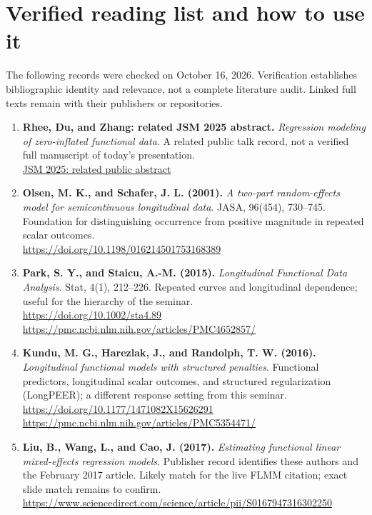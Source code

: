 \documentclass[11pt]{article}
\begin{document}
\section{Verified reading list and how to use it}
The following records were checked on October 16, 2026. Verification establishes bibliographic identity and relevance, not a complete literature audit. Linked full texts remain with their publishers or repositories.
\begin{enumerate}[label=\textbf{\arabic*.},leftmargin=*]
\item \textbf{Rhee, Du, and Zhang: related JSM 2025 abstract.} \emph{Regression modeling of zero-inflated functional data}. A related public talk record, not a verified full manuscript of today's presentation.\\\href{https://ww2.amstat.org/meetings/jsm/2025/onlineprogram/abstract.cfm?sid=2865&tid=3469}{JSM 2025: related public abstract}
\item \textbf{Olsen, M. K., and Schafer, J. L. (2001).} \emph{A two-part random-effects model for semicontinuous longitudinal data}. JASA, 96(454), 730--745. Foundation for distinguishing occurrence from positive magnitude in repeated scalar outcomes.\\\url{https://doi.org/10.1198/016214501753168389}
\item \textbf{Park, S. Y., and Staicu, A.-M. (2015).} \emph{Longitudinal Functional Data Analysis}. Stat, 4(1), 212--226. Repeated curves and longitudinal dependence; useful for the hierarchy of the seminar.\\\url{https://doi.org/10.1002/sta4.89}\\\url{https://pmc.ncbi.nlm.nih.gov/articles/PMC4652857/}
\item \textbf{Kundu, M. G., Harezlak, J., and Randolph, T. W. (2016).} \emph{Longitudinal functional models with structured penalties}. Functional predictors, longitudinal scalar outcomes, and structured regularization (LongPEER); a different response setting from this seminar.\\\url{https://doi.org/10.1177/1471082X15626291}\\\url{https://pmc.ncbi.nlm.nih.gov/articles/PMC5354471/}
\item \textbf{Liu, B., Wang, L., and Cao, J. (2017).} \emph{Estimating functional linear mixed-effects regression models}. Publisher record identifies these authors and the February 2017 article. Likely match for the live FLMM citation; exact slide match remains to confirm.\\\url{https://www.sciencedirect.com/science/article/pii/S0167947316302250}

\end{enumerate}
\end{document}
